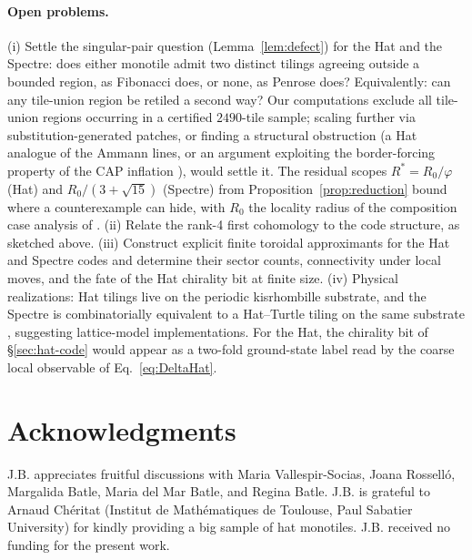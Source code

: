 \documentclass[a4paper,unpublished]{quantumarticle}
\theoremstyle{remark}
\newcommand{\gphi}{\varphi}
\begin{document}
\paragraph{Open problems.}
(i) Settle the singular-pair question (Lemma~\ref{lem:defect}) for
the Hat and the Spectre: does either monotile admit two distinct
tilings agreeing outside a bounded region, as Fibonacci does, or
none, as Penrose does? Equivalently: can any tile-union region be
retiled a second way? Our computations exclude all tile-union regions occurring
in a certified $2490$-tile sample; scaling further via
substitution-generated patches, or
finding a structural obstruction (a Hat analogue of the Ammann
lines, or an argument exploiting the border-forcing property of the
CAP inflation \cite[Fig.~9]{BGMM2025}), would settle it. The residual scopes
$R^{*} = R_{0}/\gphi$ (Hat) and $R_{0}/(3+\sqrt{15})$ (Spectre) from
Proposition~\ref{prop:reduction} bound where a counterexample can
hide, with $R_{0}$ the locality radius of the composition case
analysis of \cite{Smith2024hat, Smith2024spectre}.
(ii) Relate the rank-4 first cohomology to the code structure, as
sketched above.
(iii) Construct explicit finite toroidal approximants for the Hat and
Spectre codes and determine their sector counts, connectivity under
local moves, and the fate of the Hat chirality bit at finite
size.
(iv) Physical realizations: Hat tilings live on the periodic
kisrhombille substrate, and the Spectre is combinatorially equivalent
to a Hat--Turtle tiling on the same substrate
\cite[Thm.~3.1]{Smith2024spectre}, suggesting lattice-model
implementations. For the Hat, the chirality bit of
\S\ref{sec:hat-code} would appear as a two-fold ground-state label
read by the coarse local observable of Eq.~\eqref{eq:DeltaHat}.

\section*{Acknowledgments}
J.B. appreciates fruitful discussions with Maria Vallespir-Socias,
Joana Rossell\'o, Margalida Batle, Maria del Mar Batle, and Regina
Batle. J.B. is grateful to Arnaud Ch\'eritat (Institut de
Math\'ematiques de Toulouse, Paul Sabatier University) for kindly
providing a big sample of hat monotiles. J.B. received no funding for
the present work.
\end{document}
